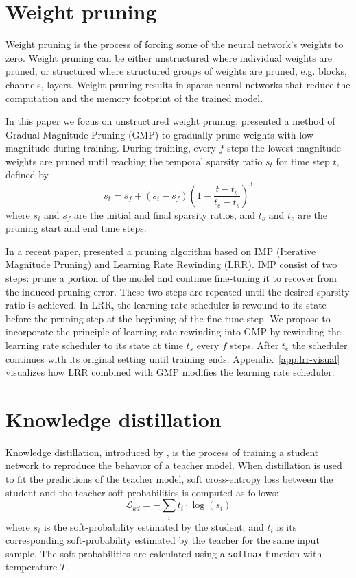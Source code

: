 \documentclass{article}
\begin{document}
\section{Weight pruning}
\label{sec:weight-pruning}
Weight pruning is the process of forcing some of the neural network's weights to zero.
Weight pruning can be either unstructured where individual weights are pruned, or structured where structured groups of weights are pruned, e.g. blocks, channels, layers.
Weight pruning results in sparse neural networks that reduce the computation and the memory footprint of the trained model.

In this paper we focus on unstructured weight pruning.
\citet{zhu2017prune} presented a method of Gradual Magnitude Pruning (GMP) to gradually prune weights with low magnitude during training.
During training, every $f$ steps the lowest magnitude weights are pruned until reaching the temporal sparsity ratio $s_t$ for time step $t$, defined by
\begin{equation}
\label{eq:pruning-sched}
    s_t = s_f + \left(s_i - s_f\right)\left(1 - \frac{t - t_s}{t_e - t_s} \right)^3
\end{equation}
where $s_i$ and $s_f$ are the initial and final sparsity ratios, and $t_s$ and $t_e$ are the pruning start and end time steps.

In a recent paper, \citet{renda2020rewind} presented a pruning algorithm based on IMP (Iterative Magnitude Pruning) \citep{han2015imp} and Learning Rate Rewinding (LRR).
IMP consist of two steps: prune a portion of the model and continue fine-tuning it to recover from the induced pruning error.
These two steps are repeated until the desired sparsity ratio is achieved.
In LRR, the learning rate scheduler is rewound to its state before the pruning step at the beginning of the fine-tune step.
We propose to incorporate the principle of learning rate rewinding into GMP by rewinding the learning rate scheduler to its state at time $t_s$ every $f$ steps.
After $t_e$ the scheduler continues with its original setting until training ends.
Appendix~\ref{app:lrr-visual} visualizes how LRR combined with GMP modifies the learning rate scheduler.

\section{Knowledge distillation}
\label{sec:kd}
Knowledge distillation, introduced by \citet{hinton2015distilling}, is the process of training a student network to reproduce the behavior of a teacher model. When distillation is used to fit the predictions of the teacher model, soft cross-entropy loss between the student and the teacher soft probabilities is computed as follows:
\begin{equation}
\label{eq:distillation loss}
    \mathcal{L}_{kd} = -\sum_{i}{t_i \cdot \log\left(s_i\right)}
\end{equation}
where $s_i$ is the soft-probability estimated by the student, and $t_i$ is its corresponding soft-probability estimated by the teacher for the same input sample. The soft probabilities are calculated using a \texttt{softmax} function with temperature $T$.
\end{document}
